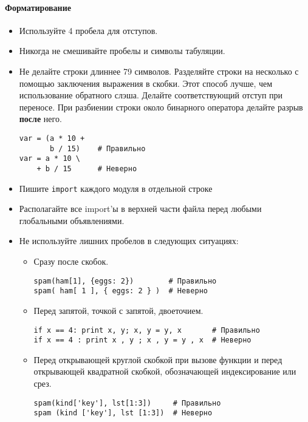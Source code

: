 \documentclass[a4paper, 12pt]{article}
\begin{document}
\paragraph{Форматирование}

\begin{itemize}
\item Используйте 4 пробела для отступов.
\item Никогда не смешивайте пробелы и символы табуляции.
\item Не делайте строки длиннее 79 символов. Разделяйте строки на несколько с помощью заключения выражения в скобки. Этот способ лучше, чем использование обратного слэша. Делайте соответствующий отступ при переносе. При разбиении строки около бинарного оператора делайте разрыв \textbf{после} него.
\begin{lstlisting}[texcl]
var = (a * 10 +
       b / 15)    # Правильно
var = a * 10 \
    + b / 15      # Неверно
\end{lstlisting}

\item Пишите \lstinline{import} каждого модуля в отдельной строке
\item Располагайте все import'ы в верхней части файла перед любыми глобальными объявлениями.

\item Не используйте лишних пробелов в следующих ситуациях:
    \begin{itemize}
    \item Сразу после скобок.
        \begin{lstlisting}[texcl]
spam(ham[1], {eggs: 2})        # Правильно
spam( ham[ 1 ], { eggs: 2 } )  # Неверно
		\end{lstlisting}
    \item Перед запятой, точкой с запятой, двоеточием.
        \begin{lstlisting}[texcl]
if x == 4: print x, y; x, y = y, x       # Правильно
if x == 4 : print x , y ; x , y = y , x  # Неверно
		\end{lstlisting}
    \item Перед открывающей круглой скобкой при вызове функции и перед открывающей квадратной скобкой, обозначающей индексирование или срез.
        \begin{lstlisting}[texcl]
spam(kind['key'], lst[1:3])     # Правильно
spam (kind ['key'], lst [1:3])  # Неверно
		\end{lstlisting}
    \end{itemize}


\end{itemize}
\end{document}
